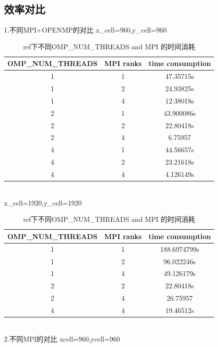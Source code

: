 \documentclass{article}
\begin{document}
\begin{CJK}{UTF8}{gbsn}
\subsection{效率对比}
1.不同MPI+OPENMP的对比
x\_cell=960,y\_cell=960
\begin{table}[h!]
    \centering
    \begin{tabular}{|c|c|c|}
    \hline
    \textbf{OMP\_NUM\_THREADS} & \textbf{MPI ranks} & \textbf{time consumption} \\
    \hline
    1 & 1 & 47.35715s \\
    \hline
    1 & 2 & 24.93825s \\
    \hline
    1 & 4 & 12.38018s \\
    \hline
    2 & 1 & 43.900086s \\
    \hline
    2 & 2 & 22.80418s \\
    \hline
    2 & 4 & 6.75957 \\
    \hline
    4 & 1 &  44.56657s \\
    \hline
    4 & 2 &  23.21618s \\
    \hline
    4 & 4 &  4.126149s \\
    \hline
    \end{tabular}
    \caption{ref下不同OMP\_NUM\_THREADS and MPI 的时间消耗}
    \label{table:combinations}
\end{table}
\\
x\_cell=1920,y\_cell=1920
\begin{table}[h!]
    \centering
    \begin{tabular}{|c|c|c|}
    \hline
    \textbf{OMP\_NUM\_THREADS} & \textbf{MPI ranks} & \textbf{time consumption} \\
    \hline
    1 & 1 & 188.6974799s \\
    \hline
    1 & 2 & 96.022246s \\
    \hline
    1 & 4 & 49.126179s \\
    \hline
    2 & 2 & 22.80418s \\
    \hline
    2 & 4 & 26.75957 \\
    \hline
    4 & 4 & 19.46512s \\
    \hline
    \end{tabular}
    \caption{ref下不同OMP\_NUM\_THREADS and MPI 的时间消耗}
    \label{table:combinations}
\end{table}
\\
2.不同MPI的对比
\newline
xcell=960,ycell=960
\begin{table}[H]

\end{table}
\end{CJK}
\end{document}
